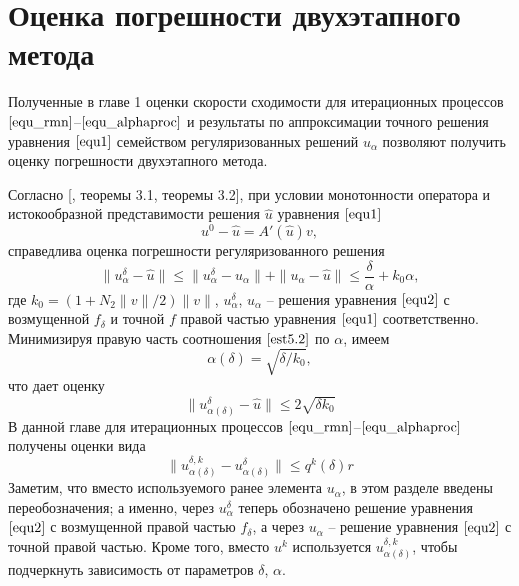 \newpage
\section{Оценка погрешности двухэтапного метода}

Полученные в главе 1 оценки скорости сходимости для итерационных процессов $\eqref{equ_rmn}$--$\eqref{equ_alphaproc}$ и результаты по аппроксимации точного решения уравнения $\eqref{equ1}$ семейством регуляризованных решений $u_\alpha$ позволяют получить оценку погрешности двухэтапного метода.

Согласно [\cite{Tau2002}, теоремы 3.1, теоремы 3.2], при условии монотонности оператора и истокообразной представимости решения $\hat{u}$ уравнения $\eqref{equ1}$
\begin{equation}\label{cond5.1}
u^0-\hat{u}=A'(\hat{u})v,
\end{equation}
справедлива оценка погрешности регуляризованного решения
\begin{equation}\label{est5.2}
\|u_\alpha^{\delta}-\hat{u}\|\le\|u_\alpha^{\delta}-u_\alpha\|+\|u_\alpha-\hat{u}\|\le\frac{\delta}{\alpha}+k_0\alpha,
\end{equation}
где $k_0=(1+N_2\|v\|/2)\|v\|$, $u_\alpha^{\delta}$, $u_\alpha$ -- решения уравнения $\eqref{equ2}$ с возмущенной $f_\delta$ и точной $f$ правой частью уравнения $\eqref{equ1}$ соответственно. Минимизируя правую часть соотношения $\eqref{est5.2}$ по $\alpha$, имеем 
\begin{equation}\label{est5.21}
	\alpha(\delta)=\sqrt{\delta /k_0},
\end{equation}
что дает оценку
\begin{equation}\label{est5.3}
\|u_{\alpha(\delta)}^{\delta}-\hat{u}\|\le 2\sqrt{\delta k_0}
\end{equation}
В данной главе для итерационных процессов $\eqref{equ_rmn}$--$\eqref{equ_alphaproc}$ получены оценки вида 
\begin{equation}\label{est5.4}
\|u_{\alpha(\delta)}^{\delta, k}-u_{\alpha(\delta)}^{\delta}\|\le q^k(\delta)r
\end{equation}
Заметим, что вместо используемого ранее элемента $u_\alpha$, в этом разделе введены переобозначения; а именно, через $u_\alpha^{\delta}$ теперь обозначено решение уравнения $\eqref{equ2}$ с возмущенной правой частью $f_\delta$, а через $u_\alpha$ -- решение уравнения $\eqref{equ2}$ с точной правой частью. Кроме того, вместо $u^k$ используется $u_{\alpha(\delta)}^{\delta, k}$, чтобы подчеркнуть зависимость от параметров $\delta$, $\alpha$.

